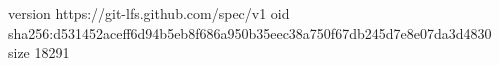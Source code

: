 version https://git-lfs.github.com/spec/v1
oid sha256:d531452aceff6d94b5eb8f686a950b35eec38a750f67db245d7e8e07da3d4830
size 18291
